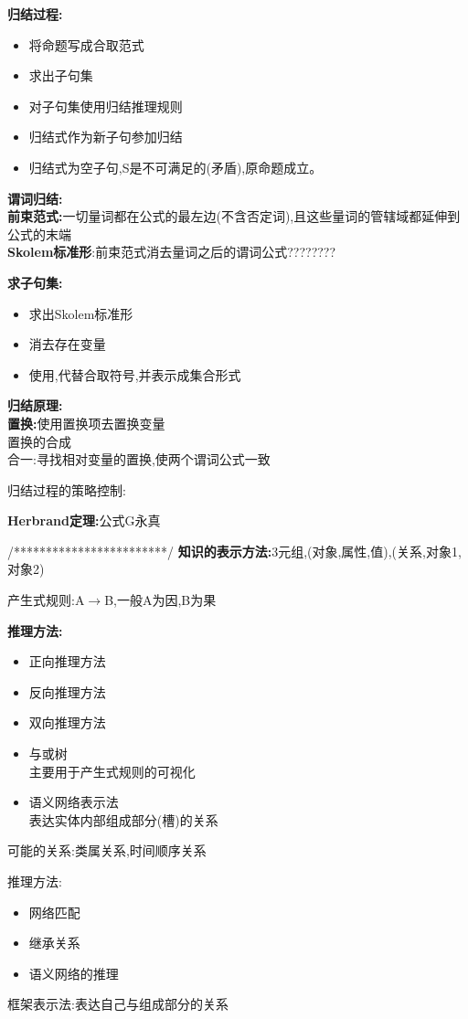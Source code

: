 \documentclass[UTF8,a4paper]{ctexart}
\begin{document}
\textbf{归结过程:}
\begin{itemize}
  \item 将命题写成合取范式
  \item 求出子句集
  \item 对子句集使用归结推理规则
  \item 归结式作为新子句参加归结
  \item 归结式为空子句,S是不可满足的(矛盾),原命题成立。
\end{itemize}

\textbf{谓词归结:}\\
\textbf{前束范式:}一切量词都在公式的最左边(不含否定词),且这些量词的管辖域都延伸到公式的末端\\
\textbf{Skolem标准形}:前束范式消去量词之后的谓词公式????????

\textbf{求子句集:}
\begin{itemize}
  \item 求出Skolem标准形
  \item 消去存在变量
  \item 使用,代替合取符号,并表示成集合形式
\end{itemize}

\textbf{归结原理:}\\
\textbf{置换:}使用置换项去置换变量\\
置换的合成\\
合一:寻找相对变量的置换,使两个谓词公式一致

归结过程的策略控制:

\textbf{Herbrand定理:}公式G永真

/************************/
\textbf{知识的表示方法:}3元组,(对象,属性,值),(关系,对象1,对象2)

产生式规则:A$\to$B,一般A为因,B为果

\textbf{推理方法:}
\begin{itemize}
  \item 正向推理方法
  \item 反向推理方法
  \item 双向推理方法
  \item 与或树\\
  主要用于产生式规则的可视化
  \item 语义网络表示法\\
  表达实体内部组成部分(槽)的关系
\end{itemize}

可能的关系:类属关系,时间顺序关系

推理方法:
\begin{itemize}
  \item 网络匹配
  \item 继承关系
  \item 语义网络的推理
\end{itemize}

框架表示法:表达自己与组成部分的关系
\end{document}
